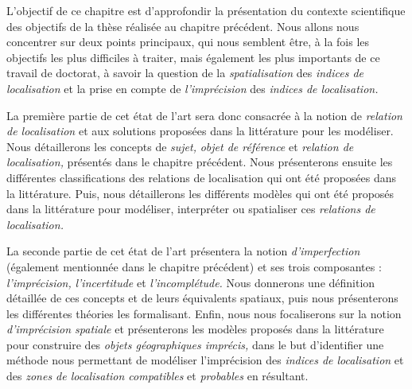 L'objectif de ce chapitre est d'approfondir la présentation du
contexte scientifique des objectifs de la thèse réalisée au chapitre
précédent. Nous allons nous concentrer sur deux points principaux, qui
nous semblent être, à la fois les objectifs les plus difficiles à
traiter, mais également les plus importants de ce travail de doctorat,
à savoir la question de la \emph{spatialisation} des \emph{indices de
  localisation} et la prise en compte de \emph{l'imprécision} des
\emph{indices de localisation.}

La première partie de cet état de l'art sera donc consacrée à la
notion de \emph{relation de localisation} et aux solutions proposées
dans la littérature pour les modéliser. Nous détaillerons les concepts
de \emph{sujet,} \emph{objet de référence} et \emph{relation de
  localisation,} présentés dans le chapitre précédent. Nous
présenterons ensuite les différentes classifications des relations de
localisation qui ont été proposées dans la littérature. Puis, nous
détaillerons les différents modèles qui ont été proposés dans la
littérature pour modéliser, interpréter ou spatialiser ces \emph{relations
  de localisation.}

La seconde partie de cet état de l'art présentera la notion
\emph{d'imperfection} (également mentionnée dans le chapitre
précédent) et ses trois composantes : \emph{l'imprécision,}
\emph{l'incertitude} et \emph{l'incomplétude.} Nous donnerons une
définition détaillée de ces concepts et de leurs équivalents spatiaux,
puis nous présenterons les différentes théories les
formalisant. Enfin, nous nous focaliserons sur la notion
\emph{d'imprécision spatiale} et présenterons les modèles proposés
dans la littérature pour construire des \emph{objets géographiques
  imprécis,} dans le but d'identifier une méthode nous permettant de
modéliser l'imprécision des \emph{indices de localisation} et des
\emph{zones de localisation compatibles} et \emph{probables} en
résultant.


